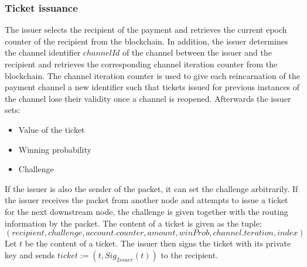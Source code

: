 \subsubsection{Ticket issuance}
The issuer selects the recipient of the payment and retrieves the current epoch counter of the recipient from the blockchain. 
In addition, the issuer determines the channel identifier $channelId$ of the channel between the issuer and the recipient and retrieves the corresponding channel iteration counter from the blockchain. 
The channel iteration counter is used to give each reincarnation of the payment channel a new identifier such that tickets issued for previous instances of the channel lose their validity once a channel is reopened.
\newline Afterwards the issuer sets:
\begin{itemize}
    \item Value of the ticket
    \item Winning probability
    \item Challenge
\end{itemize}
If the issuer is also the sender of the packet, it can set the challenge arbitrarily. 
If the issuer receives the packet from another node and attempts to issue a ticket for the next downstream node, the challenge is given together with the routing information by the packet.
The content of a ticket is given as the tuple:$$(recipient, challenge, account.counter, amount, winProb, channel.teration, index)$$ 
Let $t$ be the content of a ticket. The issuer then signs the ticket with its private key and sends $ticket:= (t, Sig_{Issuer}(t))$ to the recipient.

